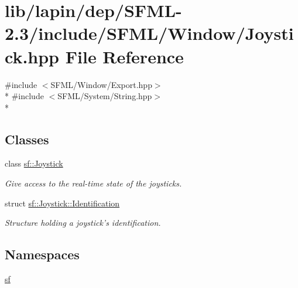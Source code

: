 \hypertarget{lapin_2dep_2_s_f_m_l-2_83_2include_2_s_f_m_l_2_window_2_joystick_8hpp}{\section{lib/lapin/dep/\-S\-F\-M\-L-\/2.3/include/\-S\-F\-M\-L/\-Window/\-Joystick.hpp File Reference}
\label{lapin_2dep_2_s_f_m_l-2_83_2include_2_s_f_m_l_2_window_2_joystick_8hpp}
}
{\ttfamily \#include $<$S\-F\-M\-L/\-Window/\-Export.\-hpp$>$}\\*
{\ttfamily \#include $<$S\-F\-M\-L/\-System/\-String.\-hpp$>$}\\*
\subsection*{Classes}
\begin{DoxyCompactItemize}
\item 
class \hyperlink{classsf_1_1_joystick}{sf\-::\-Joystick}
\begin{DoxyCompactList}\small\item\em Give access to the real-\/time state of the joysticks. \end{DoxyCompactList}\item 
struct \hyperlink{structsf_1_1_joystick_1_1_identification}{sf\-::\-Joystick\-::\-Identification}
\begin{DoxyCompactList}\small\item\em Structure holding a joystick's identification. \end{DoxyCompactList}\end{DoxyCompactItemize}
\subsection*{Namespaces}
\begin{DoxyCompactItemize}
\item 
\hyperlink{namespacesf}{sf}
\end{DoxyCompactItemize}
